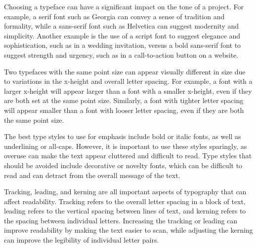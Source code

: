 \documentclass{report}
\begin{document}
    \bigbreak \noindent \bigbreak \noindent 
    \bigbreak \noindent 
    \bigbreak \noindent 
    Choosing a typeface can have a significant impact on the tone of a project. For example, a serif font such as Georgia can convey a sense of tradition and formality, while a sans-serif font such as Helvetica can suggest modernity and simplicity. Another example is the use of a script font to suggest elegance and sophistication, such as in a wedding invitation, versus a bold sans-serif font to suggest strength and urgency, such as in a call-to-action button on a website.
    
    \bigbreak \noindent \bigbreak \noindent 
    \bigbreak \noindent 
    \bigbreak \noindent 
    Two typefaces with the same point size can appear visually different in size due to variations in the x-height and overall letter spacing. For example, a font with a larger x-height will appear larger than a font with a smaller x-height, even if they are both set at the same point size. Similarly, a font with tighter letter spacing will appear smaller than a font with looser letter spacing, even if they are both the same point size.
    
    \bigbreak \noindent \bigbreak \noindent 
    \bigbreak \noindent 
    \bigbreak \noindent 
    The best type styles to use for emphasis include bold or italic fonts, as well as underlining or all-caps. However, it is important to use these styles sparingly, as overuse can make the text appear cluttered and difficult to read. Type styles that should be avoided include decorative or novelty fonts, which can be difficult to read and can detract from the overall message of the text.
    
    \bigbreak \noindent \bigbreak \noindent 
    \bigbreak \noindent 
    \bigbreak \noindent 
    Tracking, leading, and kerning are all important aspects of typography that can affect readability. Tracking refers to the overall letter spacing in a block of text, leading refers to the vertical spacing between lines of text, and kerning refers to the spacing between individual letters. Increasing the tracking or leading can improve readability by making the text easier to scan, while adjusting the kerning can improve the legibility of individual letter pairs.
    
\end{document}
